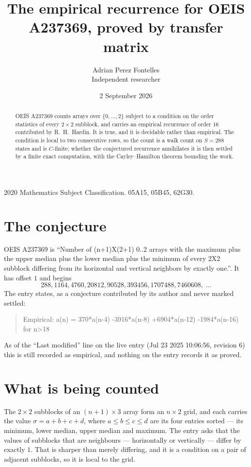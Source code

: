 \documentclass[11pt,a4paper]{article}
\title{The empirical recurrence for OEIS A237369, proved by transfer matrix}
\author{Adrian Perez Fontelles\\ \small Independent researcher}
\date{2 September 2026}
\theoremstyle{plain}
\theoremstyle{definition}
\begin{document}
\maketitle

\begin{abstract}
OEIS A237369 counts arrays over $\{0,\dots,2\}$ subject to a condition on the order
statistics of every $2\times2$ subblock, and carries an empirical recurrence of order
$16$ contributed by R.~H.~Hardin. It is true, and it is decidable rather than empirical.
The condition is local to two consecutive rows, so the count is a walk count on $S=288$
states and is $C$-finite; whether the conjectured recurrence annihilates it is then settled by
a finite exact computation, with the Cayley--Hamilton theorem bounding the work.
\end{abstract}

\noindent\small 2020 Mathematics Subject Classification. 05A15, 05B45, 62G30.\normalsize

\section{The conjecture}

OEIS A237369 is ``Number of (n+1)X(2+1) 0..2 arrays with the maximum plus the upper median plus the lower median plus the minimum of every 2X2 subblock differing from its horizontal and vertical neighbors by exactly one.''. It has offset $1$ and begins
\[
288, 1164, 4760, 20812, 90528, 393456, 1707488, 7460608,\ \dots
\]
The entry states, as a conjecture contributed by its author and never marked settled:
\begin{quote}
Empirical: a(n) = 370*a(n-4) -3916*a(n-8) +6904*a(n-12) -1984*a(n-16) for n>18
\end{quote}
As of the ``Last modified'' line on the live entry (Jul 23 2025 10:06:56, revision 6) this is still
recorded as empirical, and nothing on the entry records it as proved.

\section{What is being counted}

The $2\times2$ subblocks of an $(n+1)\times3$ array form an
$n\times2$ grid, and each carries the value $\sigma=a+b+c+d$, where $a\le b\le c\le d$ are its four entries sorted --- its minimum, lower median, upper median and maximum. The entry asks that the values of
subblocks that are neighbours --- horizontally or vertically --- differ by exactly $1$.
That is sharper than merely differing, and it is a condition on a pair of adjacent subblocks,
so it is local to the grid.
\end{document}
